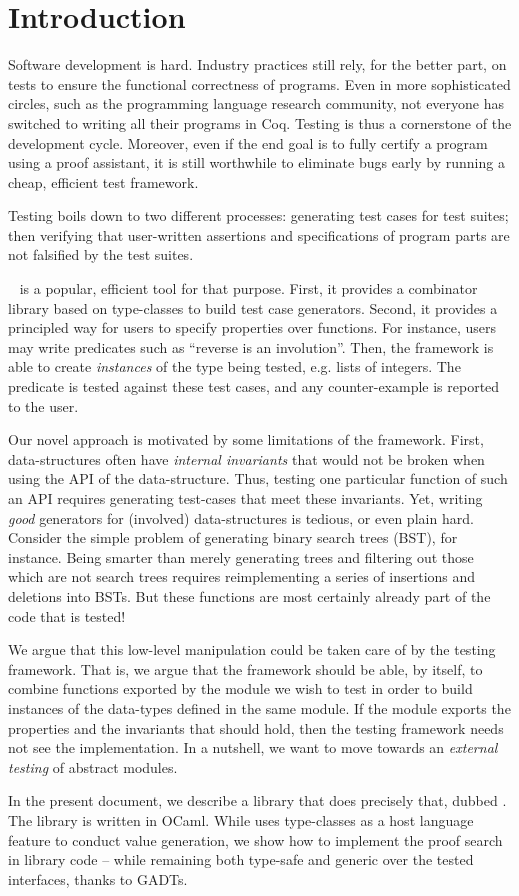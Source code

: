 \section{Introduction}
\label{sec:introduction}

Software development is hard. Industry practices still rely, for the better
part, on tests to ensure the functional correctness of programs. Even in more
sophisticated circles, such as the programming language research community, not
everyone has switched to writing all their programs in Coq. Testing is thus a
cornerstone of the development cycle. Moreover, even if the end goal is to fully
certify a program using a proof assistant, it is still worthwhile to eliminate
bugs early by running a cheap, efficient test framework.

Testing boils down to two different processes: generating test cases
for test suites; then verifying that user-written assertions and
specifications of program parts are not falsified by the test suites.

\qcheck{}~\cite{DBLP:conf/icfp/ClaessenH00} is a popular, efficient
tool for that purpose. First, it provides a combinator library based
on type-classes to build test case generators. Second, it provides
a principled way for users to specify properties over
functions. For instance, users may write predicates such as ``reverse
is an involution''. Then, the \qcheck framework is able to create
\emph{instances} of the type being tested, e.g. lists of integers.
The predicate is tested against these test cases, and any
counter-example is reported to the user.

Our novel approach is motivated by some limitations of the \qcheck
framework.
%
First, data-structures often have \emph{internal invariants} that
would not be broken when using the API of the data-structure. Thus,
testing one particular function of such an API requires generating
test-cases that meet these invariants.
%
Yet, writing \emph{good} generators for (involved) data-structures is
tedious, or even plain hard. Consider the simple problem of generating
binary search trees (BST), for instance. Being smarter than merely
generating trees and filtering out those which are not
search trees requires reimplementing a series of insertions and
deletions into BSTs. But these functions are most certainly already
part of the code that is tested!
%

We argue that this low-level manipulation could be taken care of by
the testing framework. That is, we argue that the framework should be
able, by itself, to combine functions exported by the module we wish
to test in order to build instances of the data-types defined in the
same module. If the module exports the properties and the invariants
that should hold, then the testing framework needs not see the
implementation.
%
In a nutshell, we want to move towards an \emph{external testing} of abstract
modules.

In the present document, we describe a library that does precisely
that, dubbed \arti. The library is written in OCaml. While \qcheck
uses type-classes as a host language feature to conduct value
generation, we show how to implement the proof search in library
code -- while remaining both type-safe and generic over the
tested interfaces, thanks to GADTs.
